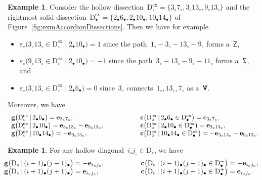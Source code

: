 \documentclass{amsart}
\theoremstyle{definition}
\newtheorem{example}[theorem]{Example}
\renewcommand{\b}[1]{\mathbf{#1}} %
\newcommand{\fref}[1]{Figure~\ref{#1}} %
\newcommand{\dissection}{\mathrm{D}} %
\newcommand{\signcirc}[3]{{\varepsilon_\circ \big( {#1} \in {#2} \;|\; {#3} \big)}} %
\newcommand{\SSS}{\reflectbox{$\mathsf{Z}$}} %
\newcommand{\ZZZ}{\mathsf{Z}} %
\newcommand{\VVV}{{\mathsf{{V \hspace{-.1686cm} I\,}}}} %
\newcommand{\biggvector}[2]{\mathbf{g} \big( #1 \,|\, #2 \big)} %
\newcommand{\bigcvector}[3]{\mathbf{c} \big( #1  \,|\, #3 \in #2 \big)} %
\newcommand{\mi}{-} %
\newcommand{\ma}{+} %
\newcommand{\ex}{\mathrm{ex}} %
\begin{document}
\begin{example}
Consider the hollow dissection~$\dissection_\circ^\ex = \{3_\circ 7_\circ, 3_\circ 13_\circ, 9_\circ 13_\circ\}$ and the rightmost solid dissection~$\dissection_\bullet^\ex = \{2_\bullet 6_\bullet, 2_\bullet 10_\bullet, 10_\bullet 14_\bullet\}$ of \fref{fig:exmAccordionDissections}. Then we have for example
\begin{itemize}
\item $\signcirc{3_\circ 13_\circ}{\dissection_\circ^\ex}{2_\bullet 10_\bullet} = 1$ since the path~$1_\circ - 3_\circ - 13_\circ - 9_\circ$ forms a~$\ZZZ$, 
\item $\signcirc{9_\circ 13_\circ}{\dissection_\circ^\ex}{2_\bullet 10_\bullet} = -1$ since the path~$3_\circ - 13_\circ - 9_\circ - 11_\circ$ forms a~$\SSS$, and
\item $\signcirc{3_\circ 13_\circ}{\dissection_\circ^\ex}{2_\bullet 6_\bullet} = 0$ since~$3_\circ$ connects~$1_\circ, 13_\circ, 7_\circ$ as a~$\VVV$.
\end{itemize}
Moreover, we have
\[
\begin{array}{l@{\hspace{2cm}}l}
	\biggvector{\dissection_\circ^\ex}{2_\bullet 6_\bullet} = \b{e}_{3_\circ 7_\circ}, &
	\bigcvector{\dissection_\circ^\ex}{\dissection_\bullet^\ex}{2_\bullet 6_\bullet} = \b{e}_{3_\circ 7_\circ}, \\
	\biggvector{\dissection_\circ^\ex}{2_\bullet 10_\bullet} = \b{e}_{3_\circ 13_\circ} - \b{e}_{9_\circ 13_\circ}, &
	\bigcvector{\dissection_\circ^\ex}{\dissection_\bullet^\ex}{2_\bullet 10_\bullet} = \b{e}_{3_\circ 13_\circ}, \\
	\biggvector{\dissection_\circ^\ex}{10_\bullet 14_\bullet} = - \b{e}_{9_\circ 13_\circ}, &
	\bigcvector{\dissection_\circ^\ex}{\dissection_\bullet^\ex}{10_\bullet 14_\bullet} = - \b{e}_{3_\circ 13_\circ} - \b{e}_{9_\circ 13_\circ}.
\end{array}
\]
\end{example}

\begin{example}
\label{exm:gcvectors}
For any hollow diagonal~$i_\circ j_\circ \in \dissection_\circ$, we have
\[
\begin{array}{@{\hspace{-.2cm}}l@{\hspace{1.9cm}}l}
	\biggvector{\dissection_\circ}{(i-1)_\bullet (j-1)_\bullet} = - \b{e}_{i_\circ j_\circ}, &
	\bigcvector{\dissection_\circ}{\dissection_\bullet^\mi}{(i-1)_\bullet (j-1)_\bullet} = - \b{e}_{i_\circ j_\circ}, \\
	\biggvector{\dissection_\circ}{(i+1)_\bullet (j+1)_\bullet} =   \b{e}_{i_\circ j_\circ}, &
	\bigcvector{\dissection_\circ}{\dissection_\bullet^\ma}{(i+1)_\bullet (j+1)_\bullet} =   \b{e}_{i_\circ j_\circ}.
\end{array}
\]

\end{example}
\end{document}
